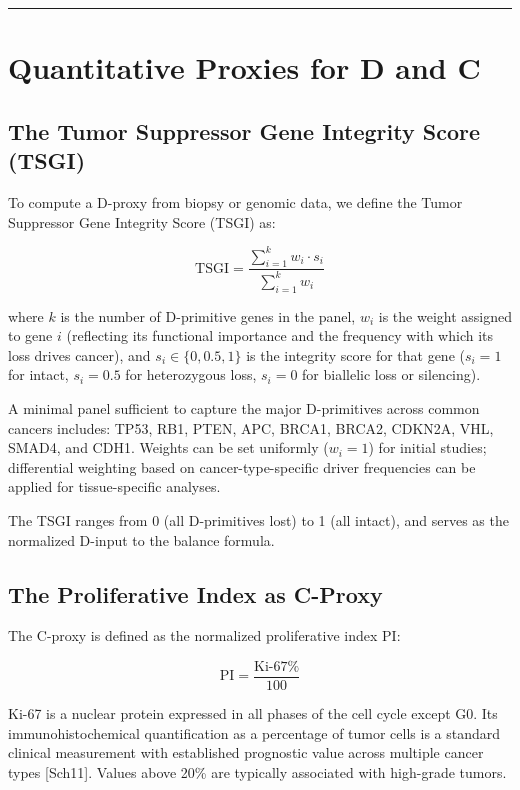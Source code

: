 \documentclass[12pt]{article}
\begin{document}
\begin{center}\rule{0.5\linewidth}{0.5pt}\end{center}

\section{Quantitative Proxies for D and C}\label{quantitative-proxies-for-d-and-c}

\subsection{The Tumor Suppressor Gene Integrity Score (TSGI)}\label{the-tumor-suppressor-gene-integrity-score-tsgi}

To compute a D-proxy from biopsy or genomic data, we define the Tumor
Suppressor Gene Integrity Score (TSGI) as:

\[\text{TSGI} = \frac{\sum_{i=1}^{k} w_i \cdot s_i}{\sum_{i=1}^{k} w_i}\]

where \(k\) is the number of D-primitive genes in the panel, \(w_i\) is
the weight assigned to gene \(i\) (reflecting its functional importance
and the frequency with which its loss drives cancer), and
\(s_i \in \{0, 0.5, 1\}\) is the integrity score for that gene
(\(s_i = 1\) for intact, \(s_i = 0.5\) for heterozygous loss,
\(s_i = 0\) for biallelic loss or silencing).

A minimal panel sufficient to capture the major D-primitives across
common cancers includes: TP53, RB1, PTEN, APC, BRCA1, BRCA2, CDKN2A,
VHL, SMAD4, and CDH1. Weights can be set uniformly (\(w_i = 1\)) for
initial studies; differential weighting based on cancer-type-specific
driver frequencies can be applied for tissue-specific analyses.

The TSGI ranges from 0 (all D-primitives lost) to 1 (all intact), and
serves as the normalized D-input to the balance formula.

\subsection{The Proliferative Index as C-Proxy}\label{the-proliferative-index-as-c-proxy}

The C-proxy is defined as the normalized proliferative index
\(\text{PI}\):

\[\text{PI} = \frac{\text{Ki-67\%}}{100}\]

Ki-67 is a nuclear protein expressed in all phases of the cell cycle
except G0. Its immunohistochemical quantification as a percentage of
tumor cells is a standard clinical measurement with established
prognostic value across multiple cancer types {[}Sch11{]}. Values above
20\% are typically associated with high-grade tumors.
\end{document}
